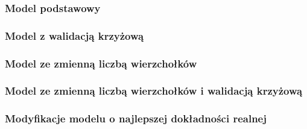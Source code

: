 \subsubsection{Model podstawowy}


\subsubsection{Model z walidacją krzyżową}


\subsubsection{Model ze zmienną liczbą wierzchołków}


\subsubsection{Model ze zmienną liczbą wierzchołków i walidacją krzyżową}


\subsubsection{Modyfikacje modelu o najlepszej dokładności realnej}
